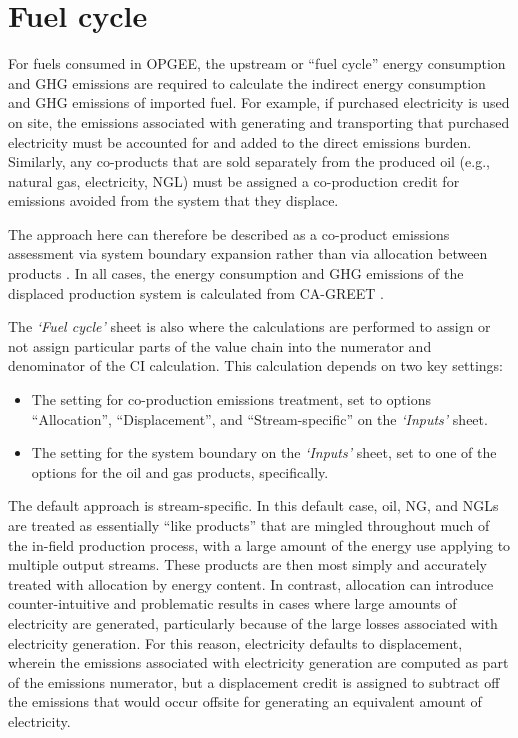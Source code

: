 \documentclass[11pt]{report}
\newcommand{\sheet}[1]{\textit{`{#1}'}}
\begin{document}
\section{Fuel cycle} \label{sec:fuel_cycle}

For fuels consumed in OPGEE, the upstream or ``fuel cycle'' energy consumption and GHG emissions are required to calculate the indirect energy consumption and GHG emissions of imported fuel. For example, if purchased electricity is used on site, the emissions associated with generating and transporting that purchased electricity must be accounted for and added to the direct emissions burden. Similarly, any co-products that are sold separately from the produced oil (e.g., natural gas, electricity, NGL) must be assigned a co-production credit for emissions avoided from the system that they displace. 

The approach here can therefore be described as a co-product emissions assessment via system boundary expansion rather than via allocation between products \cite{ISO2006a, ISO2006b}. In all cases, the energy consumption and GHG emissions of the displaced production system is calculated from CA-GREET \cite{Wang2009}. 

The \sheet{Fuel cycle} sheet is also where the calculations are performed to assign or not assign particular parts of the value chain into the numerator and denominator of the CI calculation. This calculation depends on two key settings:
\begin{itemize}
\item The setting for co-production emissions treatment, set to options ``Allocation'', ``Displacement'', and ``Stream-specific'' on the \sheet{Inputs} sheet.
\item The setting for the system boundary on the \sheet{Inputs} sheet, set to one of the options for the oil and gas products, specifically.
\end{itemize}

The default approach is stream-specific. In this default case, oil, NG, and NGLs are treated as essentially ``like products'' that are mingled throughout much of the in-field production process, with a large amount of the energy use applying to multiple output streams. These products are then most simply and accurately treated with allocation by energy content. In contrast, allocation can introduce counter-intuitive and problematic results in cases where large amounts of electricity are generated, particularly because of the large losses associated with electricity generation. For this reason, electricity defaults to displacement, wherein the emissions associated with electricity generation are computed as part of the emissions numerator, but a displacement credit is assigned to subtract off the emissions that would occur offsite for generating an equivalent amount of electricity.
\end{document}
